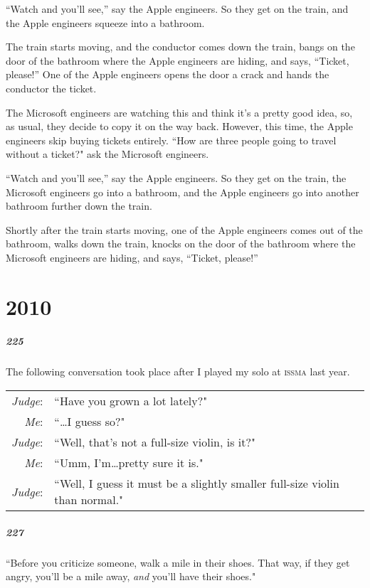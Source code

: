 \documentclass[10pt]{memoir}
\newcommand{\speakertag}[1]{\emph{#1}: }
\newcommand{\st}{\speakertag}
\begin{document}
“Watch and you'll see,” say the Apple engineers. So they get on the train, and the Apple engineers squeeze into a bathroom.

The train starts moving, and the conductor comes down the train, bangs on the door of the bathroom where the Apple engineers are hiding, and says, “Ticket, please!” One of the Apple engineers opens the door a crack and hands the conductor the ticket.

The Microsoft engineers are watching this and think it's a pretty good idea, so, as usual, they decide to copy it on the way back. However, this time, the Apple engineers skip buying tickets entirely. ``How are three people going to travel without a ticket?" ask the Microsoft engineers.

“Watch and you'll see,” say the Apple engineers. So they get on the train, the Microsoft engineers go into a bathroom, and the Apple engineers go into another bathroom further down the train.

Shortly after the train starts moving, one of the Apple engineers comes out of the bathroom, walks down the train, knocks on the door of the bathroom where the Microsoft engineers are hiding, and says, “Ticket, please!”

\chapter{2010}
\paragraph{225} The following conversation took place after I played my solo at \textsc{issma} last year.\bigskip

\noindent \begin{tabularx}{\textwidth}{r X}
\st{Judge} & ``Have you grown a lot lately?" \\
\st{Me} & ``\ldots I guess so?" \\
\st{Judge} & ``Well, that’s not a full-size violin, is it?" \\
\st{Me} & ``Umm, I’m\ldots pretty sure it is." \\
\st{Judge} & ``Well, I guess it must be a slightly smaller full-size violin than \mbox{normal}." \\
\end{tabularx}

\paragraph{227} ``Before you criticize someone, walk a mile in their shoes. That way, if they get angry, you'll be a mile away, \emph{and} you'll have their shoes."
\end{document}
